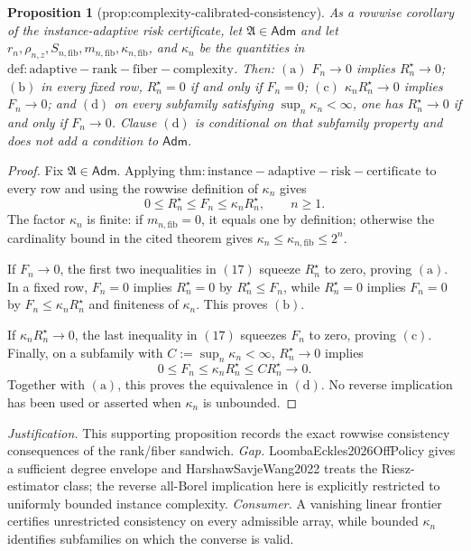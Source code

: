 \documentclass{article}
\newtheorem{proposition}{Proposition}
\begin{document}
\begin{proposition}[prop:complexity-calibrated-consistency]\label{prop:complexity-calibrated-consistency}
As a rowwise corollary of the instance-adaptive risk certificate, let \(\mathfrak A\in\mathsf{Adm}\) and let \(r_n,\rho_{n,z},S_{n,\mathrm{fib}},m_{n,\mathrm{fib}},\kappa_{n,\mathrm{fib}}\), and \(\kappa_n\) be the quantities in \(\mathrm{def:adaptive-rank-fiber-complexity}\).  Then: \(\mathrm{(a)}\) \(F_n\to0\) implies \(R_n^{\star}\to0\); \(\mathrm{(b)}\) in every fixed row, \(R_n^{\star}=0\) if and only if \(F_n=0\); \(\mathrm{(c)}\) \(\kappa_nR_n^{\star}\to0\) implies \(F_n\to0\); and \(\mathrm{(d)}\) on every subfamily satisfying \(\sup_n\kappa_n<\infty\), one has \(R_n^{\star}\to0\) if and only if \(F_n\to0\).  Clause \(\mathrm{(d)}\) is conditional on that subfamily property and does not add a condition to \(\mathsf{Adm}\).
\end{proposition}
\begin{proof}
Fix \(\mathfrak A\in\mathsf{Adm}\).  Applying \(\mathrm{thm:instance-adaptive-risk-certificate}\) to every row and using the rowwise definition of \(\kappa_n\) gives
\[
 0\le R_n^{\star}\le F_n\le\kappa_nR_n^{\star},
 \qquad n\ge1.                                                                    \tag{17}
\]
The factor \(\kappa_n\) is finite: if \(m_{n,\mathrm{fib}}=0\), it equals one by definition; otherwise the cardinality bound in the cited theorem gives \(\kappa_n\le\kappa_{n,\mathrm{fib}}\le2^n\).

If \(F_n\to0\), the first two inequalities in \((17)\) squeeze \(R_n^{\star}\) to zero, proving \(\mathrm{(a)}\).  In a fixed row, \(F_n=0\) implies \(R_n^{\star}=0\) by \(R_n^{\star}\le F_n\), while \(R_n^{\star}=0\) implies \(F_n=0\) by \(F_n\le\kappa_nR_n^{\star}\) and finiteness of \(\kappa_n\).  This proves \(\mathrm{(b)}\).

If \(\kappa_nR_n^{\star}\to0\), the last inequality in \((17)\) squeezes \(F_n\) to zero, proving \(\mathrm{(c)}\).  Finally, on a subfamily with \(C:=\sup_n\kappa_n<\infty\), \(R_n^{\star}\to0\) implies
\[
 0\le F_n\le\kappa_nR_n^{\star}\le C R_n^{\star}\longrightarrow0.
\]
Together with \(\mathrm{(a)}\), this proves the equivalence in \(\mathrm{(d)}\).  No reverse implication has been used or asserted when \(\kappa_n\) is unbounded.
\end{proof}
\par\smallskip\noindent \textit{Justification.} This supporting proposition records the exact rowwise consistency consequences of the rank/fiber sandwich. \textit{Gap.} LoombaEckles2026OffPolicy gives a sufficient degree envelope and HarshawSavjeWang2022 treats the Riesz-estimator class; the reverse all-Borel implication here is explicitly restricted to uniformly bounded instance complexity. \textit{Consumer.} A vanishing linear frontier certifies unrestricted consistency on every admissible array, while bounded \(\kappa_n\) identifies subfamilies on which the converse is valid.
\end{document}
